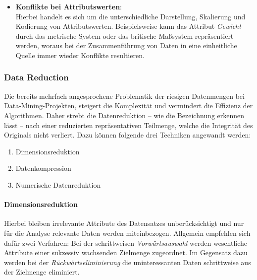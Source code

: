 \begin{itemize}
\item \textbf{Konflikte bei Attributswerten}:
\\ Hierbei handelt es sich um die unterschiedliche Darstellung, Skalierung und Kodierung von Attributswerten. Beispielsweise kann das Attribut \textit{Gewicht} durch das metrische System oder das britische Maßsystem repräsentiert werden, woraus bei der Zusammenführung von Daten in eine einheitliche Quelle immer wieder Konflikte resultieren. 
\end{itemize}

\subsubsection{Data Reduction}
\label{dr}
Die bereits mehrfach angesprochene Problematik der riesigen Datenmengen bei Data-Mining-Projekten, steigert die Komplexität und vermindert die Effizienz der Algorithmen. Daher strebt die Datenreduktion -- wie die Bezeichnung erkennen lässt -- nach einer reduzierten repräsentativen Teilmenge, welche die Integrität des Originals nicht verliert. Dazu können folgende drei Techniken angewandt werden: 

\begin{enumerate}

\item Dimensionsreduktion 

\item Datenkompression

\item Numerische Datenreduktion

\end{enumerate}

\paragraph{Dimensionsreduktion}
Hierbei bleiben irrelevante Attribute des Datensatzes unberücksichtigt und nur für die Analyse relevante Daten werden miteinbezogen. Allgemein empfehlen sich dafür zwei Verfahren: Bei der schrittweisen \textit{Vorwärtsauswahl} werden wesentliche Attribute einer sukzessiv wachsenden Zielmenge zugeordnet. Im Gegensatz dazu werden bei der \textit{Rückwärtseliminierung} die uninteressanten Daten schrittweise aus der Zielmenge eliminiert. 

